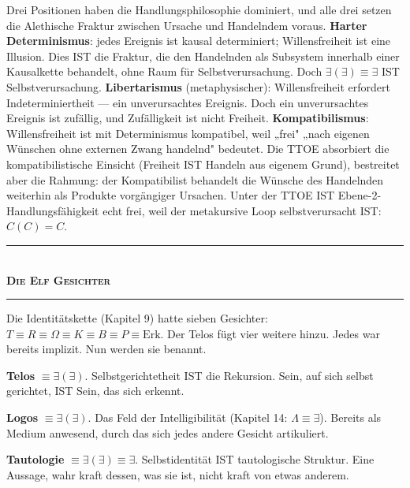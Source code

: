\documentclass[10pt, openany, oneside]{book}
\renewcommand{\normalsize}{\fontsize{10}{13}\selectfont}
\begin{document}
Drei Positionen haben die Handlungsphilosophie dominiert, und alle drei setzen die Alethische Fraktur zwischen Ursache und Handelndem voraus. \textbf{Harter Determinismus}: jedes Ereignis ist kausal determiniert; Willensfreiheit ist eine Illusion. Dies IST die Fraktur, die den Handelnden als Subsystem innerhalb einer Kausalkette behandelt, ohne Raum für Selbstverursachung. Doch $\exists(\exists) \equiv \exists$ IST Selbstverursachung. \textbf{Libertarismus} (metaphysischer): Willensfreiheit erfordert Indeterminiertheit --- ein unverursachtes Ereignis. Doch ein unverursachtes Ereignis ist zufällig, und Zufälligkeit ist nicht Freiheit. \textbf{Kompatibilismus}: Willensfreiheit ist mit Determinismus kompatibel, weil „frei" „nach eigenen Wünschen ohne externen Zwang handelnd" bedeutet. Die TTOE absorbiert die kompatibilistische Einsicht (Freiheit IST Handeln aus eigenem Grund), bestreitet aber die Rahmung: der Kompatibilist behandelt die Wünsche des Handelnden weiterhin als Produkte vorgängiger Ursachen. Unter der TTOE IST Ebene-2-Handlungsfähigkeit echt frei, weil der metakursive Loop selbstverursacht IST: $C(C) = C$.

\vspace{1.5em}

\begin{center}
    \rule{0.3\textwidth}{0.4pt}\\[0.5em]
    {\normalsize\bfseries\scshape Die Elf Gesichter}\\[0.3em]
    \rule{0.3\textwidth}{0.4pt}
\end{center}

\vspace{1em}

\noindent Die Identitätskette (Kapitel 9) hatte sieben Gesichter: $T \equiv R \equiv \Omega \equiv K \equiv B \equiv P \equiv \text{Erk}$. Der Telos fügt vier weitere hinzu. Jedes war bereits implizit. Nun werden sie benannt.

\textbf{Telos} $\equiv \exists(\exists)$. Selbstgerichtetheit IST die Rekursion. Sein, auf sich selbst gerichtet, IST Sein, das sich erkennt.

\textbf{Logos} $\equiv \exists(\exists)$. Das Feld der Intelligibilität (Kapitel 14: $\Lambda \equiv \exists$). Bereits als Medium anwesend, durch das sich jedes andere Gesicht artikuliert.

\textbf{Tautologie} $\equiv \exists(\exists) \equiv \exists$. Selbstidentität IST tautologische Struktur. Eine Aussage, wahr kraft dessen, was sie ist, nicht kraft von etwas anderem.
\end{document}
